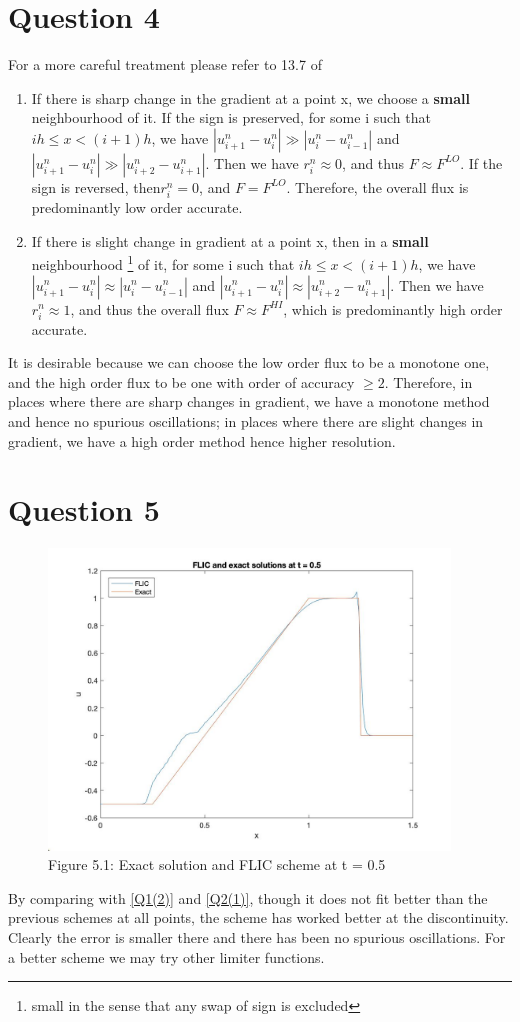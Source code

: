 \documentclass[a4paper,11pt]{article}
\begin{document}
\section{Question 4}
For a more careful treatment please refer to 13.7 of \cite{Toro}
\begin{enumerate}[label = (\roman*)]
\item
If there is sharp change in the gradient at a point x, we choose a \textbf{small} neighbourhood of it. If the sign is preserved, for some i such that $ih\leqslant x< (i+1)h$, we have $|u^n_{i+1}-u^n_i |\gg|u^n_i -u^n_{i-1}|$ and  $|u^n_{i+1}-u^n_i |\gg|u^n_{i+2} -u^n_{i+1}|$. Then we have $r_i^n \approx 0$, and thus $F \approx F^{LO}$. If the sign is reversed, then$r_i^n = 0$, and $F = F^{LO}$. Therefore, the overall flux is predominantly low order accurate.
\item
If there is slight change in gradient at a point x, then in a \textbf{small} neighbourhood \footnote{small in the sense that any swap of sign is excluded} of it, for some i such that $ih\leqslant x< (i+1)h$, we have $|u^n_{i+1}-u^n_i |\approx|u^n_i -u^n_{i-1}|$ and $|u^n_{i+1}-u^n_i |\approx |u^n_{i+2} -u^n_{i+1}|$. Then we have $r_i^n \approx 1$, and thus the overall flux $F \approx F^{HI}$, which is predominantly high order accurate.
\end{enumerate}
It is desirable because we can choose the low order flux to be a monotone one, and the high order flux to be one with order of accuracy $\geqslant 2$. Therefore, in places where there are sharp changes in gradient, we have a monotone method and hence no spurious oscillations; in places where there are slight changes in gradient, we have a high order method hence higher resolution. 
\section{Question 5}
\begin{figure}[H]
 \center
 \includegraphics[width = 0.9\linewidth, height =8cm]{Q5.jpg}
 \caption{Figure 5.1: Exact solution and FLIC scheme at t = 0.5}
 \label{Q5}
\end{figure}
By comparing with \ref{Q1(2)} and \ref{Q2(1)}, though it does not fit better than the previous schemes at all points, the scheme has worked better at the discontinuity. Clearly the error is smaller there and there has been no spurious oscillations. For a better scheme we may try other limiter functions.
\end{document}
